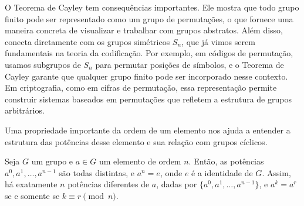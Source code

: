 \begin{remark}
  O Teorema de Cayley tem consequências importantes. Ele mostra que todo grupo
  finito pode ser representado como um grupo de permutações, o que fornece uma
  maneira concreta de visualizar e trabalhar com grupos abstratos. Além disso,
  conecta diretamente com os grupos simétricos $S_n$, que já vimos serem
  fundamentais na teoria da codificação. Por exemplo, em códigos de permutação,
  usamos subgrupos de $S_n$ para permutar posições de símbolos, e o Teorema de
  Cayley garante que qualquer grupo finito pode ser incorporado nesse contexto.
  Em criptografia, como em cifras de permutação, essa representação permite
  construir sistemas baseados em permutações que refletem a estrutura de grupos
  arbitrários.
\end{remark}








Uma propriedade importante da ordem de um elemento nos ajuda a entender a
estrutura das potências desse elemento e sua relação com grupos cíclicos.

\begin{theorem}
  Seja $G$ um grupo e $a \in G$ um elemento de ordem $n$. Então, as potências
  $a^0, a^1, \ldots, a^{n-1}$ são todas distintas, e $a^n = e$, onde $e$ é a
  identidade de $G$. Assim, há exatamente $n$ potências diferentes de $a$,
  dadas por $\{ a^0, a^1, \ldots, a^{n-1} \}$, e $a^k = a^r$ se e somente se
  $k \equiv r \pmod{n}$.
\end{theorem}


